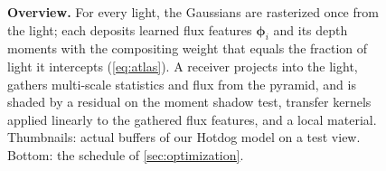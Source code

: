 \begin{figure}[t]
  \centering
  \resizebox{0.94\textwidth}{!}{}
  \caption{\textbf{Overview.}
For every light, the Gaussians are rasterized once from the light; each deposits learned flux features $\boldsymbol\phi_i$ and its depth moments with the compositing weight that equals the fraction of light it intercepts (\cref{eq:atlas}).
A receiver projects into the light, gathers multi-scale statistics and flux from the pyramid, and is shaded by a residual on the moment shadow test, transfer kernels applied linearly to the gathered flux features, and a local material.
Thumbnails: actual buffers of our Hotdog model on a test view. Bottom: the schedule of \cref{sec:optimization}.}
  \label{fig:pipeline}
\end{figure}
